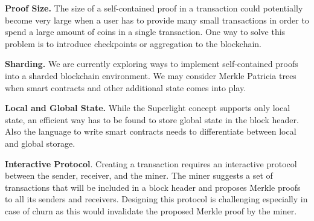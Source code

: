 \documentclass[conference]{IEEEtran}
\begin{document}
\textbf{Proof Size.} The size of a self-contained proof in a transaction could potentially become very large when a user has to provide many small transactions in order to spend a large amount of coins in a single transaction. One way to solve this problem is to introduce checkpoints or aggregation to the blockchain.

\textbf{Sharding.} We are currently exploring ways to implement self-contained proofs into a sharded blockchain environment. We may consider Merkle Patricia trees \cite{MerklePatriciaTree} when smart contracts and other additional state comes into play.

\textbf{Local and Global State.} While the Superlight concept supports only local state, an efficient way has to be found to store global state in the block header. Also the language to write smart contracts needs to differentiate between local and global storage.

\textbf{Interactive Protocol}. Creating a transaction requires an interactive protocol between the sender, receiver, and the miner. The miner suggests a set of transactions that will be included in a block header and proposes Merkle proofs to all its senders and receivers. Designing this protocol is challenging especially in case of churn as this would invalidate the proposed Merkle proof by the miner.

\balance
\end{document}
